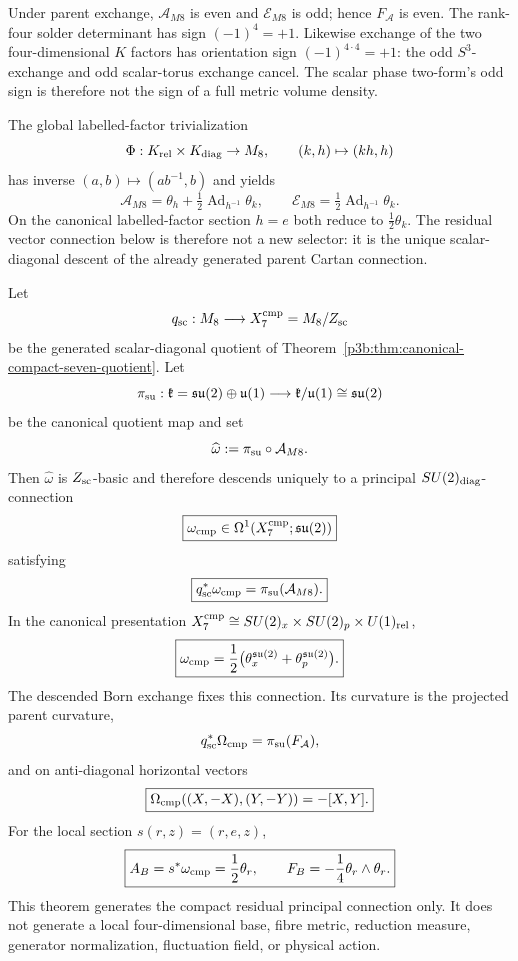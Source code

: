 \documentclass[12pt,a4paper]{article}
\begin{document}
Under parent exchange, \(\mathcal A_{M8}\) is even and
\(\mathcal E_{M8}\) is odd; hence \(F_{\mathcal A}\) is even.
The rank-four solder determinant has sign \((-1)^4=+1\).
Likewise exchange of the two four-dimensional \(K\) factors has
orientation sign \((-1)^{4\cdot4}=+1\): the odd \(S^3\)-exchange
and odd scalar-torus exchange cancel. The scalar phase two-form's odd
sign is therefore not the sign of a full metric volume density.


The global labelled-factor trivialization
\[
 \Phi:K_{\rm rel}\times K_{\rm diag}\to M_8,
 \qquad (k,h)\mapsto(kh,h)
\]
has inverse $(a,b)\mapsto(ab^{-1},b)$ and yields
\[
 \mathcal A_{M8}=\theta_h+\tfrac12\operatorname{Ad}_{h^{-1}}\theta_k,
 \qquad
 \mathcal E_{M8}=\tfrac12\operatorname{Ad}_{h^{-1}}\theta_k.
\]
On the canonical labelled-factor section $h=e$ both reduce to
$\tfrac12\theta_k$.  The residual vector connection below is therefore not a
new selector: it is the unique scalar-diagonal descent of the already
generated parent Cartan connection.

\begin{theorem}
\label{p3b:thm:parent-cartan-scalar-diagonal-descent}
Let
\[
 q_{\rm sc}:M_8\longrightarrow X_7^{\rm cmp}=M_8/Z_{\rm sc}
\]
be the generated scalar-diagonal quotient of
Theorem~\ref{p3b:thm:canonical-compact-seven-quotient}.  Let
\[
 \pi_{\rm su}:\mathfrak k=\mathfrak{su}(2)\oplus\mathfrak u(1)
 \longrightarrow \mathfrak k/\mathfrak u(1)\cong\mathfrak{su}(2)
\]
be the canonical quotient map and set
\[
 \widehat\omega:=\pi_{\rm su}\circ\mathcal A_{M8}.
\]
Then \(\widehat\omega\) is \(Z_{\rm sc}\)-basic and therefore descends
uniquely to a principal \(SU(2)_{\rm diag}\)-connection
\[
 \boxed{\omega_{\rm cmp}\in
 \Omega^1(X_7^{\rm cmp};\mathfrak{su}(2))}
\]
satisfying
\[
 \boxed{q_{\rm sc}^{*}\omega_{\rm cmp}
 =\pi_{\rm su}(\mathcal A_{M8}).}
\]
In the canonical presentation
\(X_7^{\rm cmp}\cong SU(2)_x\times SU(2)_p\times U(1)_{\rm rel}\),
\[
 \boxed{\omega_{\rm cmp}
 =\frac12\bigl(\theta_x^{\mathfrak{su}(2)}
                 +\theta_p^{\mathfrak{su}(2)}\bigr).}
\]
The descended Born exchange fixes this connection.  Its curvature is the
projected parent curvature,
\[
 q_{\rm sc}^{*}\Omega_{\rm cmp}
 =\pi_{\rm su}(F_{\mathcal A}),
\]
and on anti-diagonal horizontal vectors
\[
 \boxed{\Omega_{\rm cmp}((X,-X),(Y,-Y))=-[X,Y].}
\]
For the local section \(s(r,z)=(r,e,z)\),
\[
 \boxed{A_B=s^*\omega_{\rm cmp}=\frac12\theta_r,\qquad
 F_B=-\frac14\theta_r\wedge\theta_r.}
\]
This theorem generates the compact residual principal connection only.  It
does not generate a local four-dimensional base, fibre metric, reduction
measure, generator normalization, fluctuation field, or physical action.
\end{theorem}
\end{document}
